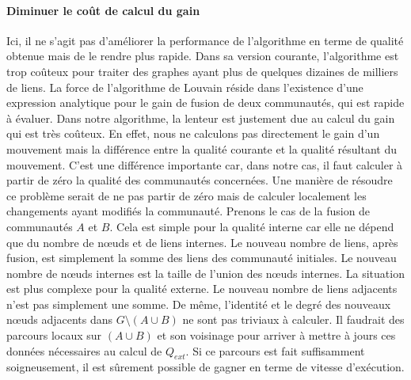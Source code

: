 \paragraph{Diminuer le coût de calcul du gain}
Ici, il ne s'agit pas d'améliorer la performance de l'algorithme en terme de qualité obtenue mais de le rendre plus rapide.
Dans sa version courante, l'algorithme est trop coûteux pour traiter des graphes ayant plus de quelques dizaines de milliers de liens.
La force de l'algorithme de Louvain réside dans l'existence d'une expression analytique pour le gain de fusion de deux communautés, qui est rapide à évaluer.
Dans notre algorithme, la lenteur est justement due au calcul du gain qui est très coûteux.
En effet, nous ne calculons pas directement le gain d'un mouvement mais la différence entre la qualité courante et la qualité résultant du mouvement.
C'est une différence importante car, dans notre cas, il faut calculer à partir de zéro la qualité des communautés concernées.
Une manière de résoudre ce problème serait de ne pas partir de zéro mais de calculer localement les changements ayant modifiés la communauté.
Prenons le cas de la fusion de communautés $A$ et $B$.
Cela est simple pour la qualité interne car elle ne dépend que du nombre de n\oe{}uds et de liens internes.
Le nouveau nombre de liens, après fusion, est simplement la somme des liens des communauté initiales.
Le nouveau nombre de n\oe{}uds internes est la taille de l'union des n\oe{}uds internes.
La situation est plus complexe pour la qualité externe.
Le nouveau nombre de liens adjacents n'est pas simplement une somme.
De même, l'identité et le degré des nouveaux n\oe{}uds adjacents dans $G \setminus (A \cup B)$ ne sont pas triviaux à calculer.
Il faudrait des parcours locaux sur $(A \cup B)$ et son voisinage pour arriver à mettre à jours ces données nécessaires au calcul de $Q_{ext}$. 
Si ce parcours est fait suffisamment soigneusement, il est sûrement possible de gagner en terme de vitesse d'exécution.


